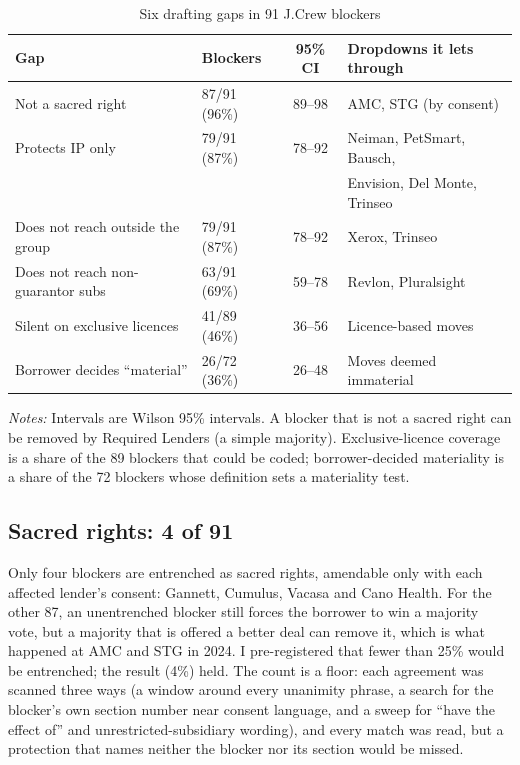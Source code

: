 \documentclass[12pt]{article}
\newcommand{\tabnote}[1]{\par\vspace{3pt}\begin{minipage}{\linewidth}\footnotesize\setstretch{1}\textit{Notes:} #1\end{minipage}}
\begin{document}
\begin{table}[!htbp]\centering
\begin{threeparttable}
\caption{Six drafting gaps in 91 J.Crew blockers}\label{tab:gaps}
\begin{tabularx}{\linewidth}{Llcl}
\toprule
Gap & Blockers & 95\% CI & Dropdowns it lets through\\\midrule
Not a sacred right & 87/91 (96\%) & 89--98 & AMC, STG (by consent)\\
Protects IP only & 79/91 (87\%) & 78--92 & Neiman, PetSmart, Bausch,\\
 & & & Envision, Del Monte, Trinseo\\
Does not reach outside the group & 79/91 (87\%) & 78--92 & Xerox, Trinseo\\
Does not reach non-guarantor subs & 63/91 (69\%) & 59--78 & Revlon, Pluralsight\\
Silent on exclusive licences & 41/89 (46\%) & 36--56 & Licence-based moves\\
Borrower decides ``material'' & 26/72 (36\%) & 26--48 & Moves deemed immaterial\\
\bottomrule
\end{tabularx}
\tabnote{Intervals are Wilson 95\% intervals. A blocker that is not a sacred right can be removed by Required Lenders (a simple majority). Exclusive-licence coverage is a share of the 89 blockers that could be coded; borrower-decided materiality is a share of the 72 blockers whose definition sets a materiality test.}
\end{threeparttable}
\end{table}

\subsection{Sacred rights: 4 of 91}
Only four blockers are entrenched as sacred rights, amendable only with each affected lender's consent: Gannett, Cumulus, Vacasa and Cano Health. For the other 87, an unentrenched blocker still forces the borrower to win a majority vote, but a majority that is offered a better deal can remove it, which is what happened at AMC and STG in 2024. I pre-registered that fewer than 25\% would be entrenched; the result (4\%) held. The count is a floor: each agreement was scanned three ways (a window around every unanimity phrase, a search for the blocker's own section number near consent language, and a sweep for ``have the effect of'' and unrestricted-subsidiary wording), and every match was read, but a protection that names neither the blocker nor its section would be missed.
\end{document}
